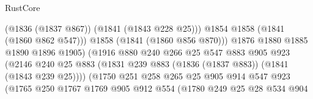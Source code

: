 \begin{lexlean}{RustCore}
\begin{coremodule}
                                              (@1836 (@1837 @867))
                                              (@1841 (@1843 @228 @25)))
                                            @1854
                                            @1858
                                            (@1841 (@1860 @862 @547)))
                                          @1858
                                          (@1841 (@1860 @856 @870)))
                                        @1876
                                        @1880
                                        @1885
                                        @1890
                                        @1896
                                        @1905)
                                      (@1916
                                        @880
                                        @240
                                        @266
                                        @25
                                        @547
                                        @883
                                        @905
                                        @923
                                        (@2146
                                          @240
                                          @25
                                          @883
                                          (@1831
                                            @239
                                            @883
                                            (@1836 (@1837 @883))
                                            (@1841 (@1843 @239 @25))))
                                        (@1750
                                          @251
                                          @258
                                          @265
                                          @25
                                          @905
                                          @914
                                          @547
                                          @923
                                          (@1765
                                            @250
                                            @1767
                                            @1769
                                            @905
                                            @912
                                            @554
                                            (@1780
                                              @249
                                              @25
                                              @28
                                              @534
                                              @904

\end{coremodule}
\end{lexlean}
